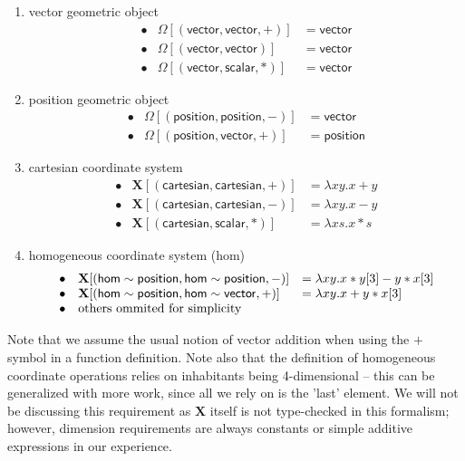 \documentclass{article}
\newcommand{\Chi}{\mathbf{X}}
\begin{document}
\begin{enumerate}
	\item \textsf{vector} geometric object
	 \[\begin{array}{lll}%
		\bullet& \Omega[(\mathsf{vector},\mathsf{vector},+)]&=\mathsf{vector}\\
		\bullet&
		\Omega[(\mathsf{vector},\mathsf{vector})]&=\mathsf{vector}\\
		\bullet&
		\Omega[(\mathsf{vector},\mathsf{scalar},*)]&=\mathsf{vector}
	\end{array}\]
	
	\item \textsf{position} geometric object
	\[\begin{array}{lll}%
		\bullet& \Omega[(\mathsf{position},\mathsf{position},-)]&=\mathsf{vector}\\
		\bullet&
		\Omega[(\mathsf{position},\mathsf{vector},+)]&=\mathsf{position}	
	\end{array}\]
	
	\item \textsf{cartesian} coordinate system\\
	\[\begin{array}{lll}%
		\bullet& 
		\Chi[(\mathsf{cartesian},\mathsf{cartesian},+)]&=\lambda xy.x + y\\
		\bullet&
		\Chi[(\mathsf{cartesian},\mathsf{cartesian},-)]&=\lambda xy.x - y\\
		\bullet&
		\Chi[(\mathsf{cartesian},\mathsf{scalar},*)]&=\lambda xs.x * s
	\end{array}\]
	
	\item homogeneous coordinate system (\textsf{hom})\\
	\[\begin{array}{lll}%
		\bullet&
		\Chi[(\mathsf{hom}\sim\mathsf{position},\mathsf{hom}\sim\mathsf{position},-)]&=\lambda xy.x * y[3] - y * x[3]\\
		\bullet&
		\Chi[(\mathsf{hom}\sim\mathsf{position},\mathsf{hom}\sim\mathsf{vector},+)]&=\lambda xy.x + y * x[3]\\
		\bullet& 
		\textnormal{others ommited for simplicity}\\
	\end{array}\]
\end{enumerate}
Note that we assume the usual notion of vector addition when using the $+$ symbol in a function definition.
Note also that the definition of homogeneous coordinate operations relies on inhabitants being 4-dimensional -- this can be generalized with more work, since all we rely on is the 'last' element.
We will not be discussing this requirement as $\Chi$ itself is not type-checked in this formalism; however, dimension requirements are always constants or simple additive expressions in our experience.
\end{document}
